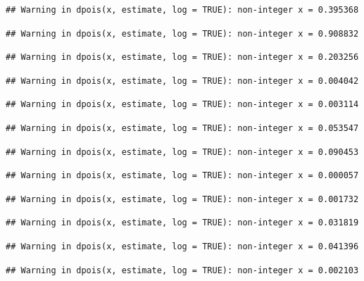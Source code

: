 \documentclass[]{article}
\begin{document}
\begin{verbatim}
## Warning in dpois(x, estimate, log = TRUE): non-integer x = 0.395368
\end{verbatim}

\begin{verbatim}
## Warning in dpois(x, estimate, log = TRUE): non-integer x = 0.908832
\end{verbatim}

\begin{verbatim}
## Warning in dpois(x, estimate, log = TRUE): non-integer x = 0.203256
\end{verbatim}

\begin{verbatim}
## Warning in dpois(x, estimate, log = TRUE): non-integer x = 0.004042
\end{verbatim}

\begin{verbatim}
## Warning in dpois(x, estimate, log = TRUE): non-integer x = 0.003114
\end{verbatim}

\begin{verbatim}
## Warning in dpois(x, estimate, log = TRUE): non-integer x = 0.053547
\end{verbatim}

\begin{verbatim}
## Warning in dpois(x, estimate, log = TRUE): non-integer x = 0.090453
\end{verbatim}

\begin{verbatim}
## Warning in dpois(x, estimate, log = TRUE): non-integer x = 0.000057
\end{verbatim}

\begin{verbatim}
## Warning in dpois(x, estimate, log = TRUE): non-integer x = 0.001732
\end{verbatim}

\begin{verbatim}
## Warning in dpois(x, estimate, log = TRUE): non-integer x = 0.031819
\end{verbatim}

\begin{verbatim}
## Warning in dpois(x, estimate, log = TRUE): non-integer x = 0.041396
\end{verbatim}

\begin{verbatim}
## Warning in dpois(x, estimate, log = TRUE): non-integer x = 0.002103
\end{verbatim}
\end{document}
